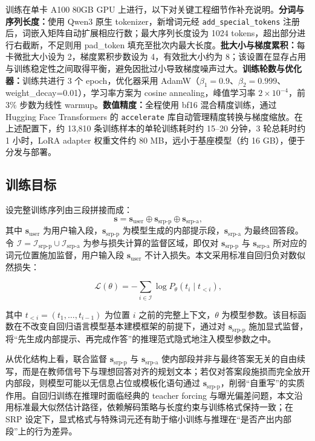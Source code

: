 训练在单卡 A100 80GB GPU 上进行，以下对关键工程细节作补充说明。\textbf{分词与序列长度：}使用 Qwen3 原生 tokenizer，新增词元经 \texttt{add\_special\_tokens} 注册后，词嵌入矩阵自动扩展相应行数；最大序列长度设为 1024 tokens，超出部分进行右截断，不足则用 pad\_token 填充至批次内最大长度。\textbf{批大小与梯度累积：}每卡微批大小设为 2，梯度累积步数设为 4，有效批大小约为 8；该设置在显存占用与训练稳定性之间取得平衡，避免因批过小导致梯度噪声过大。\textbf{训练轮数与优化器：}训练共进行 3 个 epoch，优化器采用 AdamW（$\beta_1=0.9$、$\beta_2=0.999$、weight\_decay=0.01），学习率方案为 cosine annealing，峰值学习率 $2\times10^{-4}$，前 3\% 步数为线性 warmup。\textbf{数值精度：}全程使用 bf16 混合精度训练，通过 Hugging Face Transformers 的 \texttt{accelerate} 库自动管理精度转换与梯度缩放。在上述配置下，约 13{,}810 条训练样本的单轮训练耗时约 15--20 分钟，3 轮总耗时约 1 小时，LoRA adapter 权重文件约 80 MB，远小于基座模型（约 16 GB），便于分发与部署。

\subsection{训练目标}

设完整训练序列由三段拼接而成：
\begin{equation}
    \mathbf{s} = \mathbf{s}_{\text{user}} \oplus \mathbf{s}_{\text{srp-p}} \oplus \mathbf{s}_{\text{srp-a}}\text{,}
\end{equation}
其中 $\mathbf{s}_{\text{user}}$ 为用户输入段，$\mathbf{s}_{\text{srp-p}}$ 为模型生成的内部提示段，$\mathbf{s}_{\text{srp-a}}$ 为最终回答段。令 $\mathcal{I} = \mathcal{I}_{\text{srp-p}} \cup \mathcal{I}_{\text{srp-a}}$ 为参与损失计算的监督区域，即仅对 $\mathbf{s}_{\text{srp-p}}$ 与 $\mathbf{s}_{\text{srp-a}}$ 所对应的词元位置施加监督，用户输入段 $\mathbf{s}_{\text{user}}$ 不计入损失。本文采用标准自回归负对数似然损失：

\begin{equation}
    \mathcal{L}(\theta) = -\sum_{i \in \mathcal{I}} \log P_{\theta}(t_i \mid t_{<i})\text{,}
\end{equation}

其中 $t_{<i} = (t_1, \dots, t_{i-1})$ 为位置 $i$ 之前的完整上下文，$\theta$ 为模型参数。该目标函数在不改变自回归语言模型基本建模框架的前提下，通过对 $\mathbf{s}_{\text{srp-p}}$ 施加显式监督，将“先生成内部提示、再完成作答”的推理范式隐式地注入模型参数之中。

从优化结构上看，联合监督 $\mathbf{s}_{\text{srp-p}}$ 与 $\mathbf{s}_{\text{srp-a}}$ 使内部段并非与最终答案无关的自由续写，而是在教师信号下与理想回答对齐的规划文本；若仅对答案段施损而完全放开内部段，则模型可能以无信息占位或模板化语句通过 $\mathbf{s}_{\text{srp-p}}$，削弱“自重写”的实质作用。自回归训练在推理时面临经典的 teacher forcing 与曝光偏差问题，本文沿用标准最大似然估计路径，依赖解码策略与长度约束与训练格式保持一致；在 SRP 设定下，显式格式与特殊词元还有助于缩小训练与推理在“是否产出内部段”上的行为差异。

